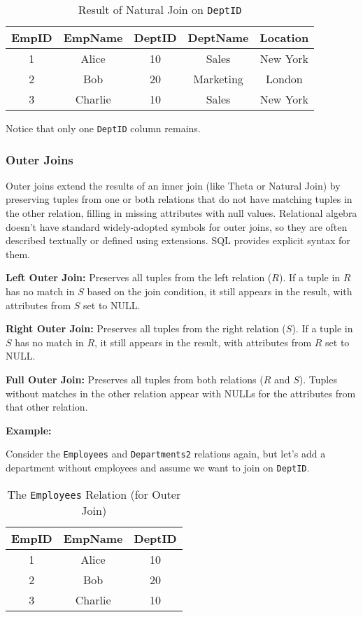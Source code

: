 \documentclass[12pt]{book}
\begin{document}
\begin{table}[htbp]
\centering
\begin{tabular}{@{}ccccc@{}}
\toprule
EmpID & EmpName & DeptID & DeptName & Location \\
\midrule
1 & Alice & 10 & Sales & New York \\
2 & Bob & 20 & Marketing & London \\
3 & Charlie & 10 & Sales & New York \\
\bottomrule
\end{tabular}
\caption{Result of Natural Join on \texttt{DeptID}}
\label{tab:natural_join_result}
\end{table}

Notice that only one \texttt{DeptID} column remains.

\subsubsection{Outer Joins}

Outer joins extend the results of an inner join (like Theta or Natural Join) by preserving tuples from one or both relations that do not have matching tuples in the other relation, filling in missing attributes with null values. Relational algebra doesn't have standard widely-adopted symbols for outer joins, so they are often described textually or defined using extensions. SQL provides explicit syntax for them.

\textbf{Left Outer Join:} Preserves all tuples from the left relation ($\mathit{R}$). If a tuple in $\mathit{R}$ has no match in $\mathit{S}$ based on the join condition, it still appears in the result, with attributes from $\mathit{S}$ set to NULL.

\textbf{Right Outer Join:} Preserves all tuples from the right relation ($\mathit{S}$). If a tuple in $\mathit{S}$ has no match in $\mathit{R}$, it still appears in the result, with attributes from $\mathit{R}$ set to NULL.

\textbf{Full Outer Join:} Preserves all tuples from both relations ($\mathit{R}$ and $\mathit{S}$). Tuples without matches in the other relation appear with NULLs for the attributes from that other relation.

\textbf{Example:}

Consider the \texttt{Employees} and \texttt{Departments2} relations again, but let's add a department without employees and assume we want to join on \texttt{DeptID}.

\begin{table}[htbp]
\centering
\begin{tabular}{@{}ccc@{}}
\toprule
EmpID & EmpName & DeptID \\
\midrule
1 & Alice & 10 \\
2 & Bob & 20 \\
3 & Charlie & 10 \\
\bottomrule
\end{tabular}
\caption{The \texttt{Employees} Relation (for Outer Join)}
\label{tab:employees_outer_join}
\end{table}
\end{document}

